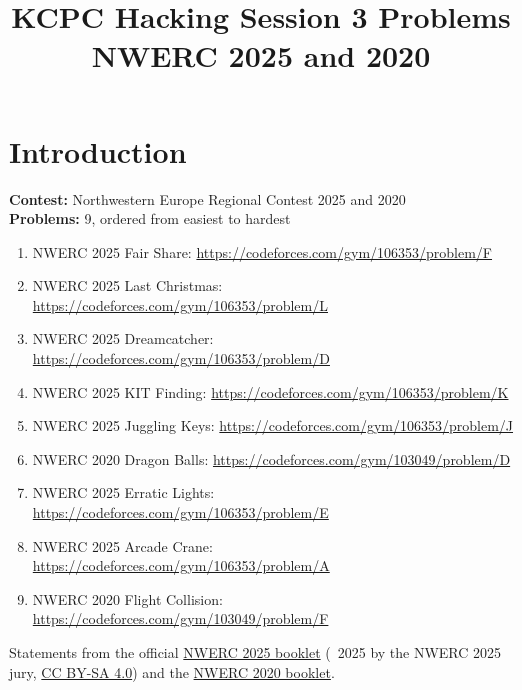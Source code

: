 \documentclass[12pt]{article}
\title{KCPC Hacking Session 3 Problems\\NWERC 2025 and 2020}
\author{}
\date{}
\begin{document}
\maketitle
\thispagestyle{fancy}

\section*{Introduction}
\noindent
\textbf{Contest:} Northwestern Europe Regional Contest 2025 and 2020\\
\textbf{Problems:} 9, ordered from easiest to hardest

\begin{enumerate}
    \renewcommand{\UrlFont}{\small}
    \item NWERC 2025 Fair Share: \url{https://codeforces.com/gym/106353/problem/F}
    \item NWERC 2025 Last Christmas: \url{https://codeforces.com/gym/106353/problem/L}
    \item NWERC 2025 Dreamcatcher: \url{https://codeforces.com/gym/106353/problem/D}
    \item NWERC 2025 KIT Finding: \url{https://codeforces.com/gym/106353/problem/K}
    \item NWERC 2025 Juggling Keys: \url{https://codeforces.com/gym/106353/problem/J}
    \item NWERC 2020 Dragon Balls: \url{https://codeforces.com/gym/103049/problem/D}
    \item NWERC 2025 Erratic Lights: \url{https://codeforces.com/gym/106353/problem/E}
    \item NWERC 2025 Arcade Crane: \url{https://codeforces.com/gym/106353/problem/A}
    \item NWERC 2020 Flight Collision: \url{https://codeforces.com/gym/103049/problem/F}
\end{enumerate}

{\small
Statements from the official \href{https://2025.nwerc.eu/problem-set.pdf}{NWERC 2025 booklet}
(\textcopyright\ 2025 by the NWERC 2025 jury, \href{https://creativecommons.org/licenses/by-sa/4.0/}{CC BY-SA 4.0})
and the \href{https://2020.nwerc.eu/files/nwerc2020problems.pdf}{NWERC 2020 booklet}.\par
}

\clearpage

\end{document}
